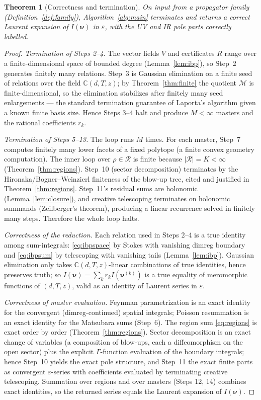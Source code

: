 \documentclass{amsart}
\newtheorem{theorem}{Theorem}
\theoremstyle{definition}
\begin{document}
\begin{theorem}[Correctness and termination]\label{thm:reduction}
On input from a propagator family (Definition~\ref{def:family}),
Algorithm~\ref{alg:main} terminates and returns a correct Laurent expansion of
$I(\boldsymbol\nu)$ in $\varepsilon$, with the UV and IR pole parts correctly
labelled.
\end{theorem}

\begin{proof}
\emph{Termination of Steps 2--4.} The vector fields $V$ and certificates $R$
range over a finite-dimensional space of bounded degree (Lemma~\ref{lem:ibp}),
so Step~2 generates finitely many relations. Step~3 is Gaussian elimination on
a finite seed of relations over the field $\mathbb C(d,T,z)$; by
Theorem~\ref{thm:finite} the quotient $\mathcal M$ is finite-dimensional, so
the elimination stabilizes after finitely many seed enlargements --- the
standard termination guarantee of Laporta's algorithm given a known finite
basis size. Hence Steps 3--4 halt and produce $M<\infty$ masters and the
rational coefficients $r_k$.

\emph{Termination of Steps 5--13.} The loop runs $M$ times. For each master,
Step~7 computes finitely many lower facets of a fixed polytope (a finite convex
geometry computation). The inner loop over $\rho\in\mathcal R$ is finite
because $|\mathcal R|=K<\infty$ (Theorem~\ref{thm:regions}). Step~10 (sector
decomposition) terminates by the Hironaka/Bogner--Weinzierl finiteness of the
blow-up tree, cited and justified in Theorem~\ref{thm:regions}. Step~11's
residual sums are holonomic (Lemma~\ref{lem:closure}), and creative
telescoping terminates on holonomic summands (Zeilberger's theorem), producing
a linear recurrence solved in finitely many steps. Therefore the whole loop
halts.

\emph{Correctness of the reduction.} Each relation used in Steps 2--4 is a
true identity among sum-integrals: \eqref{eq:ibpspace} by Stokes with vanishing
dimreg boundary and \eqref{eq:ibpsum} by telescoping with vanishing tails
(Lemma~\ref{lem:ibp}). Gaussian elimination only takes
$\mathbb C(d,T,z)$-linear combinations of true identities, hence preserves
truth; so $I(\boldsymbol\nu)=\sum_k r_k I(\boldsymbol\nu^{(k)})$ is a true
equality of meromorphic functions of $(d,T,z)$, valid as an identity of Laurent
series in $\varepsilon$.

\emph{Correctness of master evaluation.} Feynman parametrization is an exact
identity for the convergent (dimreg-continued) spatial integrals; Poisson
resummation is an exact identity for the Matsubara sums (Step~6). The region
sum \eqref{eq:regions} is exact order by order (Theorem~\ref{thm:regions}).
Sector decomposition is an exact change of variables (a composition of
blow-ups, each a diffeomorphism on the open sector) plus the explicit
$\Gamma$-function evaluation of the boundary integrals; hence Step~10 yields
the exact pole structure, and Step~11 the exact finite parts as convergent
$\varepsilon$-series with coefficients evaluated by terminating creative
telescoping. Summation over regions and over masters (Steps 12, 14) combines
exact identities, so the returned series equals the Laurent expansion of
$I(\boldsymbol\nu)$.


\end{proof}
\end{document}
